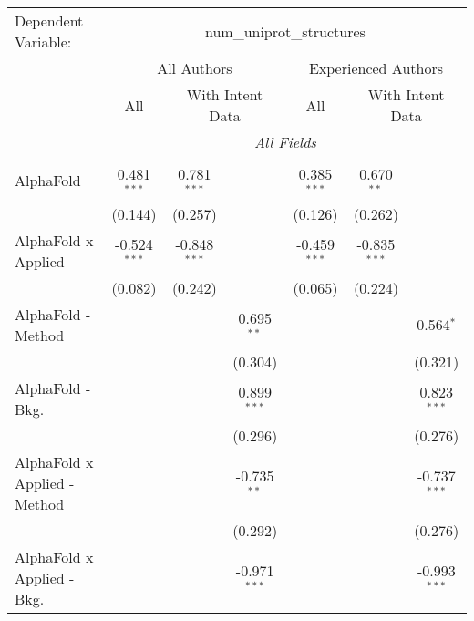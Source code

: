 \begingroup
\centering
\begin{tabular}{lcccccc}
   \tabularnewline \midrule \midrule
   Dependent Variable: & \multicolumn{6}{c}{num\_uniprot\_structures}\\
 & \multicolumn{3}{c}{All Authors} & \multicolumn{3}{c}{Experienced Authors} \\
\cmidrule(lr){2-4} \cmidrule(lr){5-7}
 & \multicolumn{1}{c}{All} & \multicolumn{2}{c}{With Intent Data} & \multicolumn{1}{c}{All} & \multicolumn{2}{c}{With Intent Data} \\
\cmidrule(lr){2-2} \cmidrule(lr){3-4} \cmidrule(lr){5-5} \cmidrule(lr){6-7}
 & \multicolumn{6}{c}{\textit{All Fields}} \\ \\
   AlphaFold                      & 0.481$^{***}$  & 0.781$^{***}$  &                & 0.385$^{***}$  & 0.670$^{**}$   &   \\   
                                  & (0.144)        & (0.257)        &                & (0.126)        & (0.262)        &   \\   
   AlphaFold x Applied            & -0.524$^{***}$ & -0.848$^{***}$ &                & -0.459$^{***}$ & -0.835$^{***}$ &   \\   
                                  & (0.082)        & (0.242)        &                & (0.065)        & (0.224)        &   \\   
   AlphaFold - Method             &                &                & 0.695$^{**}$   &                &                & 0.564$^{*}$\\   
                                  &                &                & (0.304)        &                &                & (0.321)\\   
   AlphaFold - Bkg.               &                &                & 0.899$^{***}$  &                &                & 0.823$^{***}$\\   
                                  &                &                & (0.296)        &                &                & (0.276)\\   
   AlphaFold x Applied - Method   &                &                & -0.735$^{**}$  &                &                & -0.737$^{***}$\\   
                                  &                &                & (0.292)        &                &                & (0.276)\\   
   AlphaFold x Applied - Bkg.     &                &                & -0.971$^{***}$ &                &                & -0.993$^{***}$\\   

\end{tabular}
